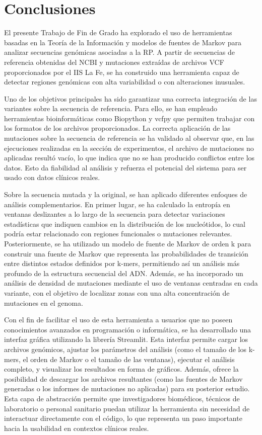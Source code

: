 \documentclass[11pt,spanish,listoffigures,listoftables]{tfgetsinf}
\begin{document}
\chapter{Conclusiones}

El presente Trabajo de Fin de Grado ha explorado el uso de herramientas basadas en la Teoría de la Información y modelos de fuentes de Markov para analizar secuencias genómicas asociadas a la \acs{RP}. A partir de secuencias de referencia obtenidas del \acs{NCBI} y mutaciones extraídas de archivos \acs{VCF} proporcionados por el \acs{IIS} La Fe, se ha construido una herramienta capaz de detectar regiones genómicas con alta variabilidad o con alteraciones inusuales.

Uno de los objetivos principales ha sido garantizar una correcta integración de las variantes sobre la secuencia de referencia. Para ello, se han empleado herramientas bioinformáticas como Biopython y vcfpy que permiten trabajar con los formatos de los archivos proporcionados. La correcta aplicación de las mutaciones sobre la secuencia de referencia se ha validado al observar que, en las ejecuciones realizadas en la sección de experimentos, el archivo de mutaciones no aplicadas resultó vacío, lo que indica que no se han producido conflictos entre los datos. Esto da fiabilidad al análisis y refuerza el potencial del sistema para ser usado con datos clínicos reales.

Sobre la secuencia mutada y la original, se han aplicado diferentes enfoques de análisis complementarios. En primer lugar, se ha calculado la entropía en ventanas deslizantes a lo largo de la secuencia para detectar variaciones estadísticas que indiquen cambios en la distribución de los nucleótidos, lo cual podría estar relacionado con regiones funcionales o mutaciones relevantes. Posteriormente, se ha utilizado un modelo de fuente de Markov de orden k para construir una fuente de Markov que representa las probabilidades de transición entre distintos estados definidos por k-mers, permitiendo así un análisis más profundo de la estructura secuencial del \acs{ADN}. Además, se ha incorporado un análisis de densidad de mutaciones mediante el uso de ventanas centradas en cada variante, con el objetivo de localizar zonas con una alta concentración de mutaciones en el genoma.

Con el fin de facilitar el uso de esta herramienta a usuarios que no poseen conocimientos avanzados en programación o informática, se ha desarrollado una interfaz gráfica utilizando la librería Streamlit. Esta interfaz permite cargar los archivos genómicos, ajustar los parámetros del análisis (como el tamaño de los k-mers, el orden de Markov o el tamaño de las ventanas), ejecutar el análisis completo, y visualizar los resultados en forma de gráficos. Además, ofrece la posibilidad de descargar los archivos resultantes (como las fuentes de Markov generadas o los informes de mutaciones no aplicadas) para su posterior estudio. Esta capa de abstracción permite que investigadores biomédicos, técnicos de laboratorio o personal sanitario puedan utilizar la herramienta sin necesidad de interactuar directamente con el código, lo que representa un paso importante hacia la usabilidad en contextos clínicos reales.
\end{document}
